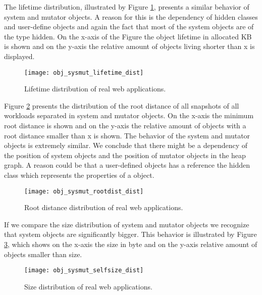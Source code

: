 The lifetime distribution, illustrated by Figure \ref{fig:obj_sysmut_lieftiem_dist}, presents a similar behavior of system and mutator objects. A reason for this is the dependency of hidden classes and user-define objects and again the fact that most of the system objects are of the type hidden. On the x-axis of the Figure the object lifetime in allocated KB is shown and on the y-axis the relative amount of objects living shorter than x is displayed. 
\begin{figure}
	\centering
	\texttt{[image: obj\_sysmut\_lifetime\_dist]}
	\caption{Lifetime distribution of real web applications.}
	\label{fig:obj_sysmut_lieftiem_dist}
\end{figure}

Figure \ref{fig:obj_sysmut_rootdist_dist} presents the distribution of the root distance of all snapshots of all workloads separated in system and mutator objects. On the x-axis the minimum root distance is shown and on the y-axis the relative amount of objects with a root distance smaller than x is shown. The behavior of the system and mutator objects is extremely similar. We conclude that there might be a dependency of the position of system objects and the position of mutator objects in the heap graph. A reason could be that a user-defined objects has a reference the hidden class which represents the properties of a object.  
\begin{figure}
	\centering
	\texttt{[image: obj\_sysmut\_rootdist\_dist]}
	\caption{Root distance distribution of real web applications.}
	\label{fig:obj_sysmut_rootdist_dist}
\end{figure}

If we compare the size distribution of system and mutator objects we recognize that system objects are significantly bigger. This behavior is illustrated by Figure \ref{fig:obj_sysmut_selfsize_dist}, which shows on the x-axis the size in byte and on the y-axis relative amount of objects smaller than size.
\begin{figure}
	\centering
	\texttt{[image: obj\_sysmut\_selfsize\_dist]}
	\caption{Size distribution of real web applications.}
	\label{fig:obj_sysmut_selfsize_dist}
\end{figure}